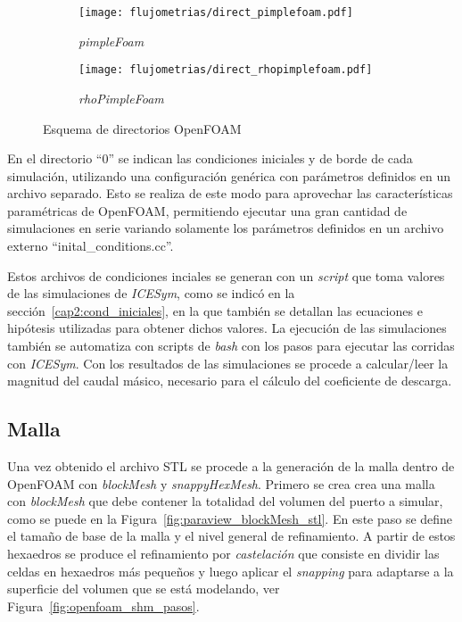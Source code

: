 \begin{figure}[ht!]
  \centering
  \begin{subfigure}[b]{0.4\textwidth}
    \centering
    \texttt{[image: flujometrias/direct\_pimplefoam.pdf]}
    \caption{\emph{pimpleFoam}\label{fig:direc_pf} }
  \end{subfigure}%
  \begin{subfigure}[b]{0.4\textwidth}
    \centering
    \texttt{[image: flujometrias/direct\_rhopimplefoam.pdf]}
    \caption{\emph{rhoPimpleFoam}\label{fig:direc_rpf} }
  \end{subfigure}
  \caption{Esquema de directorios OpenFOAM}
\end{figure}


En el directorio ``0'' se indican las condiciones iniciales y de borde de cada
simulación, utilizando una configuración genérica con parámetros definidos en un
archivo separado.
%
Esto se realiza de este modo para aprovechar las características paramétricas de
OpenFOAM, permitiendo ejecutar una gran cantidad de simulaciones en serie
variando solamente los parámetros definidos en un archivo externo
``inital\_conditions.cc''.

Estos archivos de condiciones inciales se generan con un \emph{script} que toma
valores de las simulaciones de \emph{ICESym}, como se indicó en la
sección~\ref{cap2:cond_iniciales}, en la que también se detallan las ecuaciones
e hipótesis utilizadas para obtener dichos valores.
%
La ejecución de las simulaciones también se automatiza con scripts de
\emph{bash} con los pasos para ejecutar las corridas con \emph{ICESym}.
%
Con los resultados de las simulaciones se procede a calcular/leer la magnitud
del caudal másico, necesario para el cálculo del coeficiente de descarga.


\subsection{Malla}\label{sec:cap3_of_malla}
%
Una vez obtenido el archivo STL se procede a la generación de la malla dentro de
OpenFOAM con \emph{blockMesh} y \emph{snappyHexMesh}.
%
Primero se crea crea una malla con \emph{blockMesh} que  debe contener la
totalidad del volumen del puerto a simular, como se puede en la
Figura~\ref{fig:paraview_blockMesh_stl}.
%
En este paso se define el tamaño de base de la malla y el nivel general de
refinamiento.
%
A partir de estos hexaedros se produce el refinamiento por \emph{castelación}
que consiste en dividir las celdas en hexaedros más pequeños y luego aplicar el
\emph{snapping} para adaptarse a la superficie del volumen que se está
modelando, ver Figura~\ref{fig:openfoam_shm_pasos}.
%

